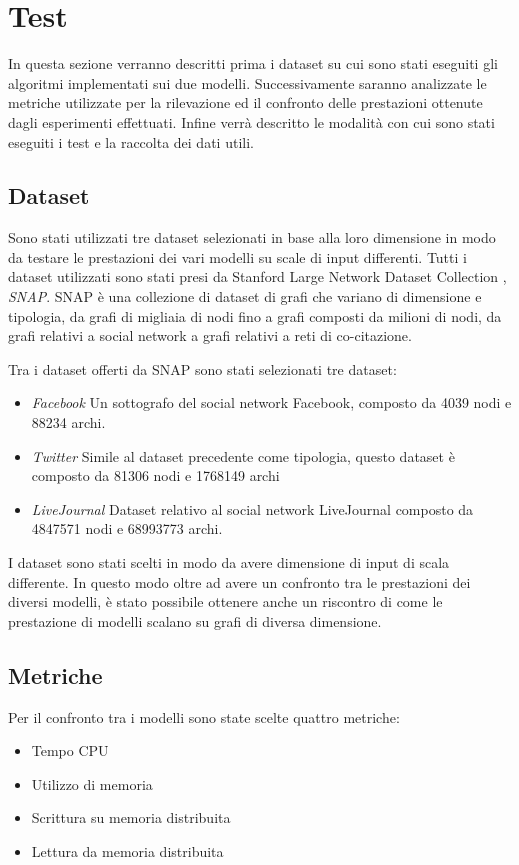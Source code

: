 \documentclass[LaM,binding=0.6cm]{sapthesis}
\begin{document}
\section{Test}

In questa sezione verranno descritti prima i dataset su cui sono stati eseguiti gli algoritmi implementati sui due modelli. Successivamente saranno analizzate le metriche utilizzate per la rilevazione ed il confronto delle prestazioni ottenute dagli esperimenti effettuati. Infine verrà descritto le modalità con cui sono stati eseguiti i test e la raccolta dei dati utili.

\subsection{Dataset}

Sono stati utilizzati tre dataset selezionati in base alla loro dimensione in modo da testare le prestazioni dei vari modelli su scale di input differenti. Tutti i dataset utilizzati sono stati presi da Stanford Large Network Dataset Collection \cite{snapnets}, \textit{SNAP}.  SNAP è una collezione di dataset di grafi che variano di dimensione e tipologia, da grafi di migliaia di nodi fino a grafi composti da milioni di nodi, da grafi relativi a social network a grafi relativi a reti di co-citazione.

Tra i dataset offerti da SNAP sono stati selezionati tre dataset: 

\begin{itemize}
\item \textit{Facebook}  Un sottografo del social network Facebook, composto da 4039 nodi e 88234 archi.
\item \textit{Twitter } Simile al dataset precedente come tipologia, questo dataset è composto da 81306 nodi e 1768149 archi
\item \textit{LiveJournal} Dataset relativo al social network LiveJournal  composto da 4847571 nodi e 68993773 archi.
\end{itemize}

I dataset sono stati scelti in modo da avere dimensione di input di scala differente. In questo modo oltre ad avere un confronto tra le prestazioni dei diversi modelli, è stato possibile ottenere anche un riscontro di come le prestazione di modelli scalano su grafi di diversa dimensione.


\subsection{Metriche}
Per il confronto tra i modelli sono state scelte quattro metriche:
\begin{itemize}
\item Tempo CPU
\item Utilizzo di memoria
\item Scrittura su memoria distribuita
\item Lettura da memoria distribuita
\end{itemize}
\end{document}
